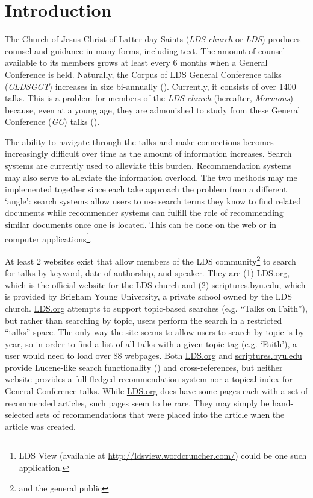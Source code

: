 \chapter{Introduction}

The Church of Jesus Christ of Latter-day Saints (\emph{LDS church} or \emph{LDS}) produces counsel and guidance in many forms, including text. The amount of counsel available to its members grows at least every 6 months when a General Conference is held. Naturally, the Corpus of LDS General Conference talks (\emph{CLDSGCT}) increases in size bi-annually (\citealp{davies:gc}). Currently, it consists of over 1400 talks. This is a problem for members of the \emph{LDS church} (hereafter, \emph{Mormons}) because, even at a young age, they are admonished to study from these General Conference (\emph{GC}) talks (\citealp{childrens_songbook}).

The ability to navigate through the talks and make connections becomes increasingly difficult over time as the amount of information increases. Search systems are currently used to alleviate this burden. Recommendation systems may also serve to alleviate the information overload. The two methods may me implemented together since each take approach the problem from a different `angle': search systems allow users to use search terms they know to find related documents while recommender systems can fulfill the role of recommending similar documents once one is located. This can be done on the web or in computer applications\footnote{LDS View (available at \url{http://ldsview.wordcruncher.com/}) could be one such application.}.

At least 2 websites exist that allow members of the LDS community\footnote{and the general public} to search for talks by keyword, date of authorship, and speaker. They are (1) \url{LDS.org}, which is the official website for the LDS church and (2) \url{scriptures.byu.edu}, which is provided by Brigham Young University, a private school owned by the LDS church. \url{LDS.org} attempts to support topic-based searches (e.g. ``Talks on Faith''), but rather than searching by topic, users perform the search in a restricted ``talks'' space. The only way the site seems to allow users to search by topic is by year, so in order to find a list of all talks with a given topic tag (e.g. `Faith'), a user would need to load over 88 webpages. Both \url{LDS.org} and \url{scriptures.byu.edu} provide Lucene-like search functionality (\citealp{McCandless:2010:LAS:1893016,lucene:luke}) and cross-references, but neither website provides a full-fledged recommendation system nor a topical index for General Conference talks. While \url{LDS.org} does have some pages each with a set of recommended articles, such pages seem to be rare. They may simply be hand-selected sets of recommendations that were placed into the article when the article was created.

